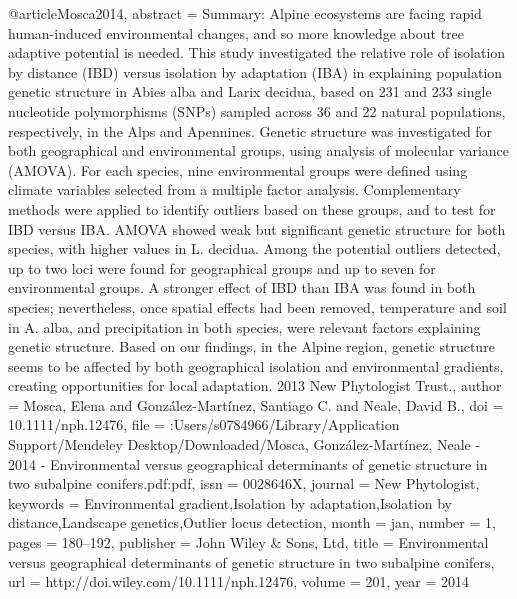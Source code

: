 @article{Mosca2014,
abstract = {Summary: Alpine ecosystems are facing rapid human-induced environmental changes, and so more knowledge about tree adaptive potential is needed. This study investigated the relative role of isolation by distance (IBD) versus isolation by adaptation (IBA) in explaining population genetic structure in Abies alba and Larix decidua, based on 231 and 233 single nucleotide polymorphisms (SNPs) sampled across 36 and 22 natural populations, respectively, in the Alps and Apennines. Genetic structure was investigated for both geographical and environmental groups, using analysis of molecular variance (AMOVA). For each species, nine environmental groups were defined using climate variables selected from a multiple factor analysis. Complementary methods were applied to identify outliers based on these groups, and to test for IBD versus IBA. AMOVA showed weak but significant genetic structure for both species, with higher values in L. decidua. Among the potential outliers detected, up to two loci were found for geographical groups and up to seven for environmental groups. A stronger effect of IBD than IBA was found in both species; nevertheless, once spatial effects had been removed, temperature and soil in A. alba, and precipitation in both species, were relevant factors explaining genetic structure. Based on our findings, in the Alpine region, genetic structure seems to be affected by both geographical isolation and environmental gradients, creating opportunities for local adaptation. {\textcopyright} 2013 New Phytologist Trust.},
author = {Mosca, Elena and Gonz{\'{a}}lez-Mart{\'{i}}nez, Santiago C. and Neale, David B.},
doi = {10.1111/nph.12476},
file = {:Users/s0784966/Library/Application Support/Mendeley Desktop/Downloaded/Mosca, Gonz{\'{a}}lez-Mart{\'{i}}nez, Neale - 2014 - Environmental versus geographical determinants of genetic structure in two subalpine conifers.pdf:pdf},
issn = {0028646X},
journal = {New Phytologist},
keywords = {Environmental gradient,Isolation by adaptation,Isolation by distance,Landscape genetics,Outlier locus detection},
month = {jan},
number = {1},
pages = {180--192},
publisher = {John Wiley {\&} Sons, Ltd},
title = {{Environmental versus geographical determinants of genetic structure in two subalpine conifers}},
url = {http://doi.wiley.com/10.1111/nph.12476},
volume = {201},
year = {2014}
}

